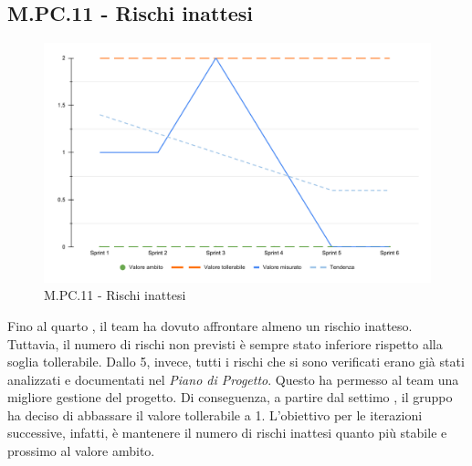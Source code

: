 \subsection{M.PC.11 - Rischi inattesi}
\begin{figure}[H]
    \centering
    \includegraphics[width=\textwidth]{assets/rischi_inattesi.pdf}
    \caption{M.PC.11 - Rischi inattesi}
\end{figure}

\par Fino al quarto , il team ha dovuto affrontare almeno un rischio inatteso. Tuttavia, il numero di rischi non previsti è sempre stato inferiore rispetto alla soglia tollerabile. Dallo  5, invece, tutti i rischi che si sono verificati erano già stati analizzati e documentati nel \textit{Piano di Progetto}. Questo ha permesso al team una migliore gestione del progetto. Di conseguenza, a partire dal settimo , il gruppo ha deciso di abbassare il valore tollerabile a 1. L'obiettivo per le iterazioni successive, infatti, è mantenere il numero di rischi inattesi quanto più stabile e prossimo al valore ambito.